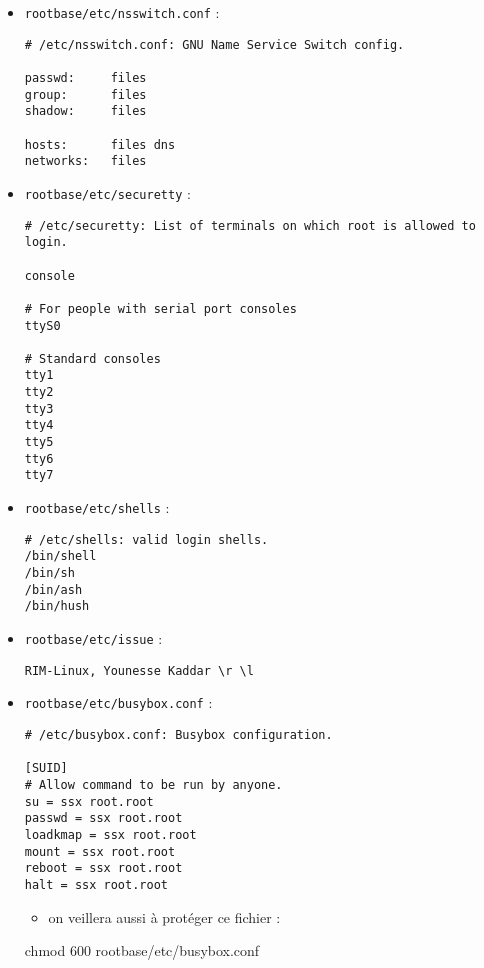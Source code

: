 \documentclass[]{article}
\newenvironment{Shaded}{}{}
\newcommand{\FunctionTok}[1]{\textcolor[rgb]{0.02,0.16,0.49}{{#1}}}
\newcommand{\NormalTok}[1]{{#1}}
\providecommand{\tightlist}{%
  \setlength{\itemsep}{0pt}\setlength{\parskip}{0pt}}
\begin{document}
\begin{itemize}
\item
  \texttt{rootbase/etc/nsswitch.conf} :

\begin{verbatim}
# /etc/nsswitch.conf: GNU Name Service Switch config.

passwd:     files
group:      files
shadow:     files

hosts:      files dns
networks:   files
\end{verbatim}
\item
  \texttt{rootbase/etc/securetty} :

\begin{verbatim}
# /etc/securetty: List of terminals on which root is allowed to login.

console

# For people with serial port consoles
ttyS0

# Standard consoles
tty1
tty2
tty3
tty4
tty5
tty6
tty7
\end{verbatim}
\item
  \texttt{rootbase/etc/shells} :

\begin{verbatim}
# /etc/shells: valid login shells.
/bin/shell
/bin/sh
/bin/ash
/bin/hush
\end{verbatim}
\item
  \texttt{rootbase/etc/issue} :

\begin{verbatim}
RIM-Linux, Younesse Kaddar \r \l
\end{verbatim}
\item
  \texttt{rootbase/etc/busybox.conf} :

\begin{verbatim}
# /etc/busybox.conf: Busybox configuration.

[SUID]
# Allow command to be run by anyone.
su = ssx root.root
passwd = ssx root.root
loadkmap = ssx root.root
mount = ssx root.root
reboot = ssx root.root
halt = ssx root.root
\end{verbatim}

  \begin{itemize}
  \tightlist
  \item
    on veillera aussi à protéger ce fichier :
  \end{itemize}

\begin{Shaded}
\begin{Highlighting}[]
\FunctionTok{chmod} \NormalTok{600 rootbase/etc/busybox.conf}
\end{Highlighting}
\end{Shaded}
\end{itemize}
\end{document}
